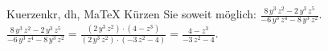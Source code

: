 \begin{MAufgabe}{Kuerzen}{kr, dh, MaTeX}
K\"urzen Sie soweit m\"oglich: $\frac{8\, y^3\, z^2 - 2\, y^3\, z^5}{ - 6\, y^3\, z^4 - 8\, y^3\, z^2}$.\\ 
\ifLsg\MLoesung
\quad $\frac{8\, y^3\, z^2 - 2\, y^3\, z^5}{ - 6\, y^3\, z^4 - 8\, y^3\, z^2}=\frac{(2\, y^3\, z^2)\cdot(4 - z^3)}{(2\, y^3\, z^2)\cdot( - 3\, z^2 - 4)}=\frac{4 - z^3}{ - 3\, z^2 - 4}$.\else\relax\fi
 \end{MAufgabe}